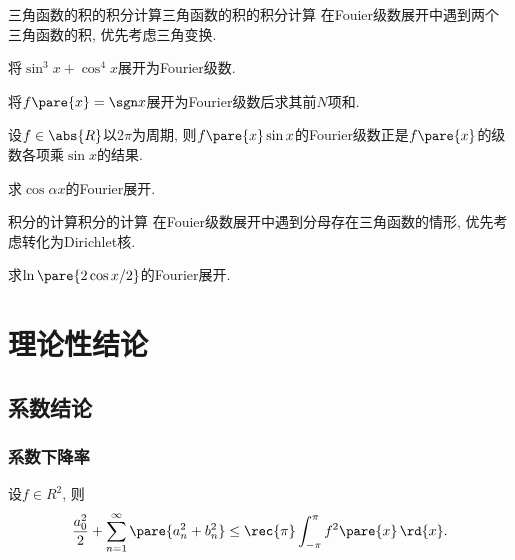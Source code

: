 \documentclass[hidelinks]{ctexart}
\begin{document}
\begin{reflex}{三角函数的积的积分计算}{三角函数的积的积分计算}
    在Fouier级数展开中遇到两个三角函数的积, 优先考虑三角变换.
\end{reflex}
\begin{ex}
    将$\sin^3 x+\cos^4 x$展开为Fourier级数.
\end{ex}
\begin{ex}
    将$f\pare{x} = \sgn x$展开为Fourier级数后求其前$N$项和.
\end{ex}
\begin{ex}
    设$f\in\abs{R}$以$2\pi$为周期, 则$f\pare{x}\sin x$的Fourier级数正是$f\pare{x}$的级数各项乘$\sin x$的结果.
\end{ex}
\begin{ex}
    求$\cos \alpha x$的Fourier展开.
\end{ex}
\begin{reflex}{积分的计算}{积分的计算}
    在Fouier级数展开中遇到分母存在三角函数的情形, 优先考虑转化为Dirichlet核.
\end{reflex}
\begin{ex}
    求$\ln \pare{2\cos x/2}$的Fourier展开.
\end{ex}




\section{理论性结论} %
\label{sec:理论性结论}

\subsection{系数结论} %
\label{sub:系数结论}

\subsubsection{系数下降率} %
\label{ssub:系数下降率}

\begin{finale}
    \begin{theorem}[Bessel不等式]
        设$f\in R^2$, 则
        \[ \frac{a_0^2}{2} + \sum_{n=1}^\infty \pare{a_n^2 + b_n^2} \le \rec{\pi}\int_{-\pi}^\pi f^2\pare{x}\,\rd{x}. \]
    \end{theorem}
\end{finale}
\end{document}
